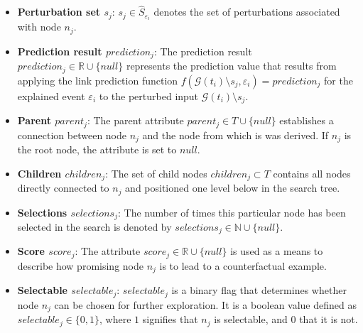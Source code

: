 \begin{itemize}
    \item \textbf{Perturbation set $s_j$}: $s_j \in \hat{S}_{\varepsilon_i}$ denotes the set of perturbations associated with node $n_j$.

    \item \textbf{Prediction result $prediction_j$}: The prediction result $prediction_j \in \mathbb{R} \cup \{null\}$ represents the prediction value that results from applying the link prediction function $f(\mathcal{G}(t_i) \setminus s_j, \varepsilon_i) = prediction_j$ for the explained event $\varepsilon_i$ to the perturbed input $\mathcal{G}(t_i) \setminus s_j$.

    \item \textbf{Parent $parent_j$}: The parent attribute $parent_j \in T \cup \{null\}$ establishes a connection between node $n_j$ and the node from which is was derived. If $n_j$ is the root node, the attribute is set to $null$.

    \item \textbf{Children $children_j$}: The set of child nodes $children_j \subset T$ contains all nodes directly connected to $n_j$ and positioned one level below in the search tree.

    \item \textbf{Selections $selections_j$}: The number of times this particular node has been selected in the search is denoted by $selections_j \in \mathbb{N} \cup \{null\}$.

    \item \textbf{Score $score_j$}: The attribute $score_j \in \mathbb{R} \cup \{null\}$ is used as a means to describe how promising node $n_j$ is to lead to a counterfactual example.

    \item \textbf{Selectable $selectable_j$}: $selectable_j$ is a binary flag that determines whether node $n_j$ can be chosen for further exploration. It is a boolean value defined as $selectable_j \in \{0, 1\}$, where $1$ signifies that $n_j$ is selectable, and $0$ that it is not.
\end{itemize}

